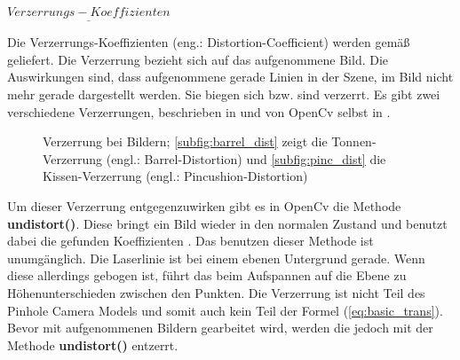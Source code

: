 		$\underline{Verzerrungs-Koeffizienten}$
		
		Die Verzerrungs-Koeffizienten (eng.: Distortion-Coefficient) werden gemäß \citep{noauthor_opencv_nodate-1} geliefert. Die Verzerrung bezieht sich auf das aufgenommene Bild. Die Auswirkungen sind, dass aufgenommene gerade Linien in der Szene, im Bild nicht mehr gerade dargestellt werden. Sie biegen sich bzw. sind verzerrt. Es gibt zwei verschiedene Verzerrungen, beschrieben in \citep[Vgl.][S. 41]{measurement_1995} und von OpenCv selbst in \citep{noauthor_opencv_nodate-2}.
		
		\begin{figure}[h]
			\centering
			\caption[Verzerrung bei Bildern]{Verzerrung bei Bildern; \ref{subfig:barrel_dist} zeigt die Tonnen-Verzerrung (engl.: Barrel-Distortion) und \ref{subfig:pinc_dist} die Kissen-Verzerrung (engl.: Pincushion-Distortion)}
			\label{fig:distortion}
		\end{figure}
	
		Um dieser Verzerrung entgegenzuwirken gibt es in OpenCv die Methode \textbf{undistort()}. Diese bringt ein Bild wieder in den normalen Zustand und benutzt dabei die gefunden Koeffizienten \citep[Vgl.][]{noauthor_opencv_nodate-1}. Das benutzen dieser Methode ist unumgänglich. Die Laserlinie ist bei einem ebenen Untergrund gerade. Wenn diese allerdings gebogen ist, führt das beim Aufspannen auf die Ebene zu Höhenunterschieden zwischen den Punkten. Die Verzerrung ist nicht Teil des Pinhole Camera Models und somit auch kein Teil der Formel (\ref{eq:basic_trans}). Bevor mit aufgenommenen Bildern gearbeitet wird, werden die jedoch mit der Methode \textbf{undistort()} entzerrt.
		
